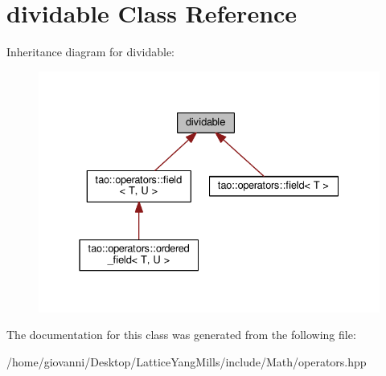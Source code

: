 \hypertarget{classdividable}{}\section{dividable Class Reference}
\label{classdividable}


Inheritance diagram for dividable\+:\nopagebreak
\begin{figure}[H]
\begin{center}
\leavevmode
\includegraphics[width=331pt]{classdividable__inherit__graph}
\end{center}
\end{figure}


The documentation for this class was generated from the following file\+:\begin{DoxyCompactItemize}
\item 
/home/giovanni/\+Desktop/\+Lattice\+Yang\+Mills/include/\+Math/operators.\+hpp\end{DoxyCompactItemize}
